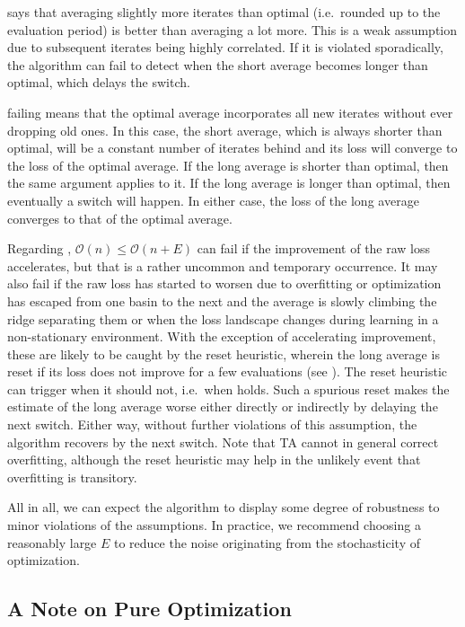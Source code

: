 \documentclass[twocolumn]{article}
\newcommand{\OL}{\mathcal{O}}
\newcommand{\tta}{\liningnums{2}TA}
\begin{document}
 says that averaging slightly more iterates than optimal (i.e.\ rounded up to the evaluation period) is better than averaging a lot more.
This is a weak assumption due to subsequent iterates being highly correlated.
If it is violated sporadically, the algorithm can fail to detect when the short average becomes longer than optimal, which delays the switch.

 failing means that the optimal average incorporates all new iterates without ever dropping old ones.
In this case, the short average, which is always shorter than optimal, will be a constant number of iterates behind and its loss will converge to the loss of the optimal average.
If the long average is shorter than optimal, then the same argument applies to it.
If the long average is longer than optimal, then eventually a switch will happen.
In either case, the loss of the long average converges to that of the optimal average.

Regarding , $\OL(n) \leq \OL(n+E)$ can fail if the improvement of the raw loss accelerates, but that is a rather uncommon and temporary occurrence.
It may also fail if the raw loss has started to worsen due to overfitting or optimization has escaped from one basin to the next and the average is slowly climbing the ridge separating them or when the loss landscape changes during learning in a non-stationary environment.
With the exception of accelerating improvement, these are likely to be caught by the reset heuristic, wherein the long average is reset if its loss does not improve for a few evaluations (see ).
The reset heuristic can trigger when it should not, i.e.\ when  holds.
Such a spurious reset makes the estimate of the long average worse either directly or indirectly by delaying the next switch.
Either way, without further violations of this assumption, the algorithm recovers by the next switch.
Note that \tta{} cannot in general correct overfitting, although the reset heuristic may help in the unlikely event that overfitting is transitory.

All in all, we can expect the algorithm to display some degree of robustness to minor violations of the assumptions.
In practice, we recommend choosing a reasonably large $E$ to reduce the noise originating from the stochasticity of optimization.

\subsection{A Note on Pure Optimization}
\label{sec:tta-pure-optimization}
\end{document}
